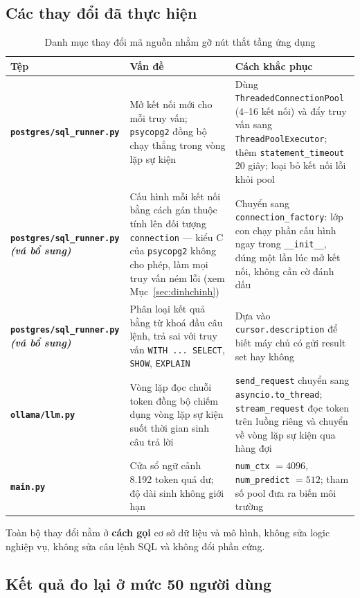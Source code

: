 \documentclass[12pt,a4paper]{article}
\begin{document}
\subsection{Các thay đổi đã thực hiện}

\begin{table}[H]
\centering
\caption{Danh mục thay đổi mã nguồn nhằm gỡ nút thắt tầng ứng dụng}
\begin{tabularx}{\textwidth}{>{\bfseries}p{3.9cm}XX}
\toprule
\rowcolor{lightblue}
Tệp & Vấn đề & Cách khắc phục\\
\midrule
\texttt{postgres/\allowbreak sql\_runner.py} &
Mở kết nối mới cho mỗi truy vấn; \texttt{psycopg2} đồng bộ chạy thẳng trong vòng lặp sự kiện &
Dùng \texttt{ThreadedConnectionPool} (4--16 kết nối) và đẩy truy vấn sang
\texttt{ThreadPoolExecutor}; thêm \texttt{statement\_timeout} 20 giây; loại bỏ
kết nối lỗi khỏi pool\\
\texttt{postgres/\allowbreak sql\_runner.py} \emph{(vá bổ sung)} &
Cấu hình mỗi kết nối bằng cách gán thuộc tính lên đối tượng \texttt{connection} ---
kiểu C của \texttt{psycopg2} không cho phép, làm mọi truy vấn ném lỗi (xem
Mục~\ref{sec:dinhchinh}) &
Chuyển sang \texttt{connection\_factory}: lớp con chạy phần cấu hình ngay trong
\texttt{\_\_init\_\_}, đúng một lần lúc mở kết nối, không cần cờ đánh dấu\\
\texttt{postgres/\allowbreak sql\_runner.py} \emph{(vá bổ sung)} &
Phân loại kết quả bằng từ khoá đầu câu lệnh, trả sai với truy vấn \texttt{WITH ...
SELECT}, \texttt{SHOW}, \texttt{EXPLAIN} &
Dựa vào \texttt{cursor.description} để biết máy chủ có gửi result set hay không\\
\texttt{ollama/llm.py} &
Vòng lặp đọc chuỗi token đồng bộ chiếm dụng vòng lặp sự kiện suốt thời gian sinh câu trả lời &
\texttt{send\_request} chuyển sang \texttt{asyncio.to\_thread}; \texttt{stream\_request}
đọc token trên luồng riêng và chuyển về vòng lặp sự kiện qua hàng đợi\\
\texttt{main.py} &
Cửa sổ ngữ cảnh 8.192 token quá dư; độ dài sinh không giới hạn &
\texttt{num\_ctx} $=4096$, \texttt{num\_predict} $=512$; tham số pool đưa ra biến
môi trường\\
\bottomrule
\end{tabularx}
\end{table}

\noindent Toàn bộ thay đổi nằm ở \textbf{cách gọi} cơ sở dữ liệu và mô hình, không
sửa logic nghiệp vụ, không sửa câu lệnh SQL và không đổi phần cứng.

\subsection{Kết quả đo lại ở mức 50 người dùng}
\end{document}
